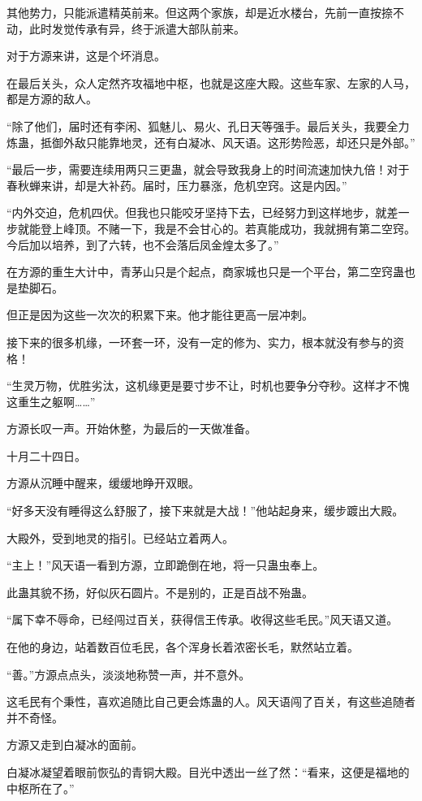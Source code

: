 \begin{this_body}
其他势力，只能派遣精英前来。但这两个家族，却是近水楼台，先前一直按捺不动，此时发觉传承有异，终于派遣大部队前来。

对于方源来讲，这是个坏消息。

在最后关头，众人定然齐攻福地中枢，也就是这座大殿。这些车家、左家的人马，都是方源的敌人。

“除了他们，届时还有李闲、狐魅儿、易火、孔日天等强手。最后关头，我要全力炼蛊，抵御外敌只能靠地灵，还有白凝冰、风天语。这形势险恶，却还只是外部。”

“最后一步，需要连续用两只三更蛊，就会导致我身上的时间流速加快九倍！对于春秋蝉来讲，却是大补药。届时，压力暴涨，危机空窍。这是内因。”

“内外交迫，危机四伏。但我也只能咬牙坚持下去，已经努力到这样地步，就差一步就能登上峰顶。不赌一下，我是不会甘心的。若真能成功，我就拥有第二空窍。今后加以培养，到了六转，也不会落后凤金煌太多了。”

在方源的重生大计中，青茅山只是个起点，商家城也只是一个平台，第二空窍蛊也是垫脚石。

但正是因为这些一次次的积累下来。他才能往更高一层冲刺。

接下来的很多机缘，一环套一环，没有一定的修为、实力，根本就没有参与的资格！

“生灵万物，优胜劣汰，这机缘更是要寸步不让，时机也要争分夺秒。这样才不愧这重生之躯啊……”

方源长叹一声。开始休整，为最后的一天做准备。

十月二十四日。

方源从沉睡中醒来，缓缓地睁开双眼。

“好多天没有睡得这么舒服了，接下来就是大战！”他站起身来，缓步踱出大殿。

大殿外，受到地灵的指引。已经站立着两人。

“主上！”风天语一看到方源，立即跪倒在地，将一只蛊虫奉上。

此蛊其貌不扬，好似灰石圆片。不是别的，正是百战不殆蛊。

“属下幸不辱命，已经闯过百关，获得信王传承。收得这些毛民。”风天语又道。

在他的身边，站着数百位毛民，各个浑身长着浓密长毛，默然站立着。

“善。”方源点点头，淡淡地称赞一声，并不意外。

这毛民有个秉性，喜欢追随比自己更会炼蛊的人。风天语闯了百关，有这些追随者并不奇怪。

方源又走到白凝冰的面前。

白凝冰凝望着眼前恢弘的青铜大殿。目光中透出一丝了然：“看来，这便是福地的中枢所在了。”


\end{this_body}
